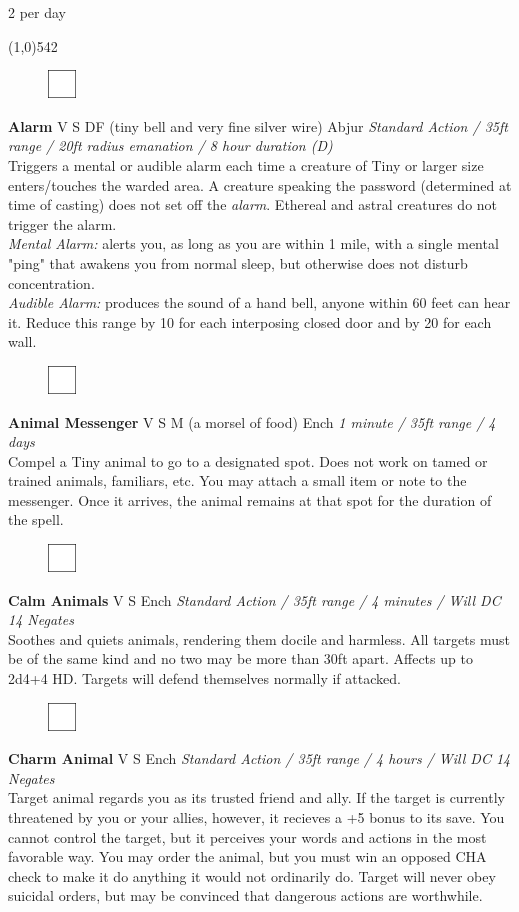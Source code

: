 \documentclass[letterpaper]{article}
\newcommand{\fullline}{\noindent\line(1,0){542} \\}
\newcommand{\spell}[7]{
\begin{figure}
\vspace{-13pt}
\ifstrequal{#2}{Full}{\includegraphics[width=2em]{Checkbox-Full}}{
                      \includegraphics[width=2em]{Checkbox}}
\ifstrequal{#7}{}{\vspace{-1em}}{\vspace{#7}}
\end{figure}
\noindent \textbf{#1} #3 {
    \ifstrequal{#4}{Conj}{\color{Plum}Conj}{%
    \ifstrequal{#4}{Divin}{\color{YellowOrange}Divin}{%
    \ifstrequal{#4}{Ench}{\color{VioletRed}Ench}{%
    \ifstrequal{#4}{Trans}{\color{LimeGreen}Trans}{%
    \ifstrequal{#4}{Evoc}{\color{RedOrange}Evoc}{%
    \ifstrequal{#4}{Illu}{\color{ProcessBlue}Illu}{%
    \ifstrequal{#4}{Abjur}{\color{CadetBlue}Abjur}{%
    \ifstrequal{#4}{Necro}{\color{Red}Necro}{%
}}}}}}}}}
{\footnotesize \emph{#5}} \\
#6
}
\begin{document}
\pagebreak

 \hspace{2em}2 per day\par
\vspace{-0.5em}
\fullline
\vspace{-1em}

\spell{Alarm}{}{V S DF (tiny bell and very fine silver wire)}{Abjur}{Standard Action / 35ft range / 20ft radius emanation / 8 hour duration (D)}{%
Triggers a mental or audible alarm each time a creature of Tiny or larger size enters/touches the warded area.  A creature speaking the password (determined at time of casting) does not set off the \emph{alarm}. Ethereal and astral creatures do not trigger the alarm.  \\
\emph{Mental Alarm:} alerts you, as long as you are within 1 mile, with a single mental "ping" that awakens you from normal sleep, but otherwise does not disturb concentration.\\ 
\emph{Audible Alarm:} produces the sound of a hand bell, anyone within 60 feet can hear it.  Reduce this range by 10 for each interposing closed door and by 20 for each wall.}{5em}

\spell{Animal Messenger}{}{V S M (a morsel of food)}{Ench}{1 minute / 35ft range / 4 days}{%
Compel a Tiny animal to go to a designated spot.  Does not work on tamed or trained animals, familiars, etc. You may attach a small item or note to the messenger.  Once it arrives, the animal remains at that spot for the duration of the spell.}{}

\spell{Calm Animals}{}{V S}{Ench}{Standard Action / 35ft range / 4 minutes / Will DC 14 Negates}{%
Soothes and quiets animals, rendering them docile and harmless.  All targets must be of the same kind and no two may be more than 30ft apart.  Affects up to 2d4+4 HD.  Targets will defend themselves normally if attacked. }{}

\spell{Charm Animal}{}{V S}{Ench}{Standard Action / 35ft range / 4 hours / Will DC 14 Negates}{%
Target animal regards you as its trusted friend and ally.  If the target is currently threatened by you or your allies, however, it recieves a +5 bonus to its save.  You cannot control the target, but it perceives your words and actions in the most favorable way.  You may order the animal, but you must win an opposed CHA check to make it do anything it would not ordinarily do.  Target will never obey suicidal orders, but may be convinced that dangerous actions are worthwhile.}{1em}
\end{document}
